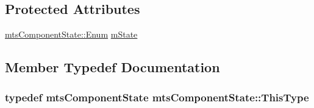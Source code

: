 \subsection*{Protected Attributes}
\begin{DoxyCompactItemize}
\item 
\hyperlink{classmts_component_state_a1158e4d2d79fff671354909e87f58928}{mts\-Component\-State\-::\-Enum} \hyperlink{classmts_component_state_a9642f5cda1abadbfde645b6e687da583}{m\-State}
\end{DoxyCompactItemize}


\subsection{Member Typedef Documentation}
\hypertarget{classmts_component_state_a668efaf1bf3c84a5448587f04d7312b5}{
\subsubsection[{This\-Type}]{\setlength{\rightskip}{0pt plus 5cm}typedef {\bf mts\-Component\-State} {\bf mts\-Component\-State\-::\-This\-Type}}}\label{classmts_component_state_a668efaf1bf3c84a5448587f04d7312b5}


